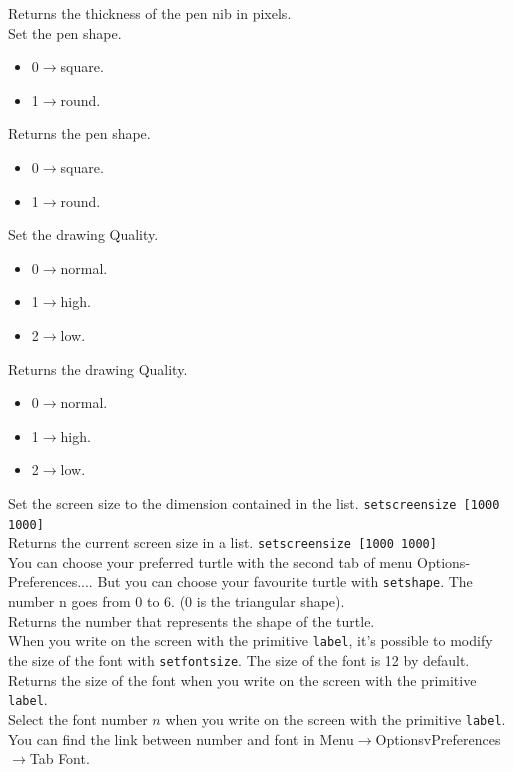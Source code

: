 Returns the thickness of the pen nib in pixels.\\
Set the pen shape.
\begin{itemize}
 \item 0$\to$square.
 \item 1$\to$round.
\end{itemize}
\noindent
{}
Returns the pen shape.
\begin{itemize}
 \item 0$\to$square.
 \item 1$\to$round.
\end{itemize}
\noindent
{}
Set the drawing Quality.
\begin{itemize}
 \item  0$\to$normal.
 \item  1$\to$high.
 \item  2$\to$low.
\end{itemize}
\noindent
{}
Returns the drawing Quality.
\begin{itemize}
 \item  0$\to$normal.
 \item  1$\to$high.
 \item  2$\to$low.
\end{itemize}
\noindent
{}
Set the screen size to the dimension contained in the list. \texttt{setscreensize [1000 1000]}\\
Returns the current screen size in a list. \texttt{setscreensize [1000 1000]}\\
You can choose your preferred turtle with the second tab of menu Options-Preferences.... But you can choose your favourite turtle with \texttt{setshape}. The number n goes from 0 to 6. (0 is the triangular shape).\\
Returns the number that represents the shape of the turtle.\\
When you write on the screen with the primitive \texttt{label}, it's possible to modify the size of the font with \texttt{setfontsize}. The size of the font is 12 by default.\\
Returns the size of the font when you write on the screen with the primitive \texttt{label}.\\
Select the font number $n$ when you write on the screen with the primitive \texttt{label}. You can find the link between number and font in Menu$\to$OptionsvPreferences$\to$Tab Font.\\
